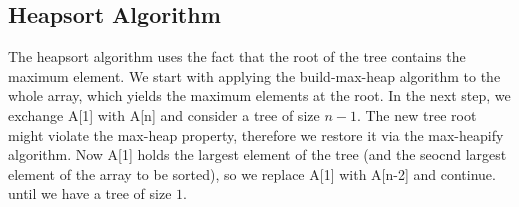 \subsection{Heapsort Algorithm}

The heapsort algorithm uses the fact that the root of the tree contains the maximum element. We start with applying the build-max-heap algorithm to the whole array, which yields the maximum elements at the root. In the next step, we exchange A[1] with A[n] and consider a tree of size $n-1$. The new tree root might violate the max-heap property, therefore we restore it via the max-heapify algorithm. Now A[1] holds the largest element of the tree (and the seocnd largest element of the array to be sorted), so we replace A[1] with A[n-2] and continue. until we have a tree of size $1$.


